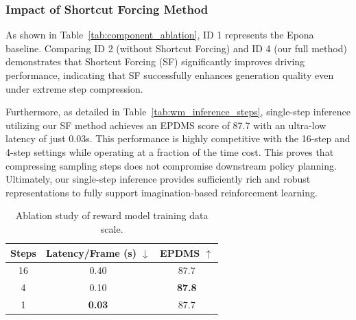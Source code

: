 \documentclass[runningheads]{llncs}
\begin{document}
\subsubsection{Impact of Shortcut Forcing Method}
As shown in Table~\ref{tab:component_ablation}, ID 1 represents the Epona baseline. Comparing ID 2 (without Shortcut Forcing) and ID 4 (our full method) demonstrates that Shortcut Forcing (SF) significantly improves driving performance, indicating that SF successfully enhances generation quality even under extreme step compression. 

Furthermore, as detailed in Table~\ref{tab:wm_inference_steps}, single-step inference utilizing our SF method achieves an EPDMS score of 87.7 with an ultra-low latency of just 0.03s. This performance is highly competitive with the 16-step and 4-step settings while operating at a fraction of the time cost. This proves that compressing sampling steps does not compromise downstream policy planning. Ultimately, our single-step inference provides sufficiently rich and robust representations to fully support imagination-based reinforcement learning.

\begin{table}[t]
    \centering
    \begin{minipage}[t]{0.45\textwidth}
        \centering
        \caption{Ablation study of Shortcut Forcing world model inference steps.}
    \begin{tabular}{c|cc}
        \toprule
        Steps & Latency/Frame (s) $\downarrow$ & EPDMS $\uparrow$ \\ 
        \midrule
        16 & 0.40 & 87.7 \\
        4 & 0.10 & \textbf{87.8} \\
        1 & \textbf{0.03} & 87.7 \\
        \bottomrule
    \end{tabular}
    \label{tab:wm_inference_steps}
    \end{minipage}
    \hfill
    \begin{minipage}[t]{0.47 \textwidth}
        \centering
       \caption{Ablation study of reward model training data scale.}
    \label{tab:data_ablation}
    \end{minipage}
\end{table}
\end{document}

